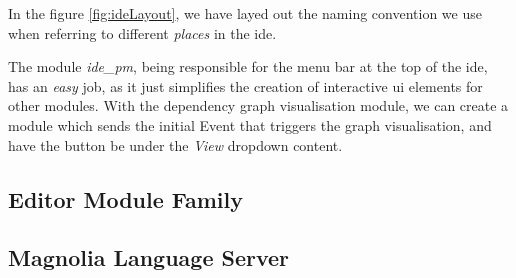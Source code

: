 In the figure \ref{fig:ideLayout}, we have layed out the naming convention we
use when referring to different \textit{places} in the \gls{ide}.


The module \textit{ide\_pm}, being responsible for the menu bar at the top of
the \gls{ide}, has an \textit{easy} job, as it just simplifies the creation of
interactive \gls{ui} elements for other modules. With the dependency graph
visualisation module, we can create a module which sends the initial Event that
triggers the graph visualisation, and have the button be under the \textit{View}
dropdown content.


\subsection{Editor Module Family}


\subsection{Magnolia Language Server}

